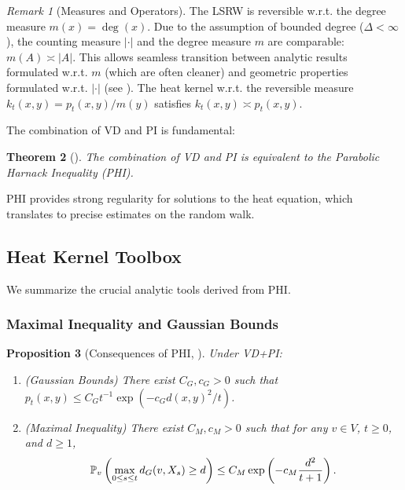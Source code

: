 \documentclass{article}
\numberwithin{equation}{section}
\newtheorem{theorem}{Theorem}[section]
\newtheorem{proposition}[theorem]{Proposition}
\theoremstyle{definition}
\theoremstyle{remark}
\newtheorem{remark}[theorem]{Remark}
\newcommand{\Prob}{\mathbb{P}}
\begin{document}
\begin{remark}[Measures and Operators]\label{rem:measures_operators}
The LSRW is reversible w.r.t. the degree measure $m(x)=\deg(x)$. Due to the assumption of bounded degree ($\Delta < \infty$), the counting measure $|\cdot|$ and the degree measure $m$ are comparable: $m(A) \asymp |A|$. This allows seamless transition between analytic results formulated w.r.t. $m$ (which are often cleaner) and geometric properties formulated w.r.t. $|\cdot|$ (see \cite{Coulhon03}). The heat kernel w.r.t. the reversible measure $k_t(x,y) = p_t(x,y)/m(y)$ satisfies $k_t(x,y) \asymp p_t(x,y)$.
\end{remark}

The combination of VD and PI is fundamental:

\begin{theorem}[\cite{Delmotte99}]\label{thm:Delmotte}
The combination of VD and PI is equivalent to the Parabolic Harnack Inequality (PHI).
\end{theorem}

PHI provides strong regularity for solutions to the heat equation, which translates to precise estimates on the random walk.

\subsection{Heat Kernel Toolbox}
We summarize the crucial analytic tools derived from PHI.

\subsubsection{Maximal Inequality and Gaussian Bounds}

\begin{proposition}[Consequences of PHI, \cite{Delmotte99}]\label{prop:maximal}
Under VD+PI:
\begin{enumerate}
    \item (Gaussian Bounds) There exist $C_G, c_G > 0$ such that $p_t(x,y) \leq C_G t^{-1} \exp(-c_G d(x,y)^2/t)$.
    \item (Maximal Inequality) There exist $C_M,c_M > 0$ such that for any $v \in V$, $t \geq 0$, and $d \geq 1$,
    \begin{equation}\label{eq:max_ineq}
    \small
    \Prob_v\left( \max_{0 \leq s \leq t} d_G(v,X_s) \geq d \right) \leq C_M \exp\left(-c_M \frac{d^2}{t+1}\right).
    \end{equation}
\end{enumerate}
\end{proposition}
\end{document}
